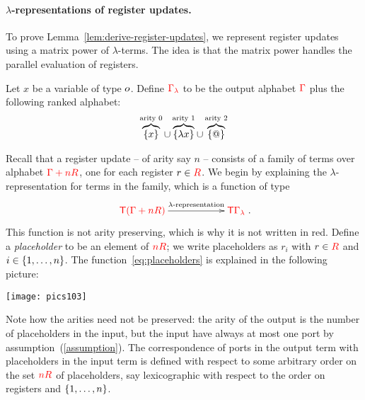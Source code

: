 \paragraph*{$\lambda$-representations of register updates.}
To prove Lemma~\ref{lem:derive-register-updates}, we represent  register updates using a matrix power of $\lambda$-terms. The idea is that the matrix power handles the parallel evaluation of registers.

Let $x$ be a  variable of type $o$. Define  ${\color{red}{\Gamma_\lambda}}$ to be the output alphabet ${\color{red}{\Gamma}}$ plus the following ranked alphabet:
\begin{align}
    \label{eq:alphabet-for-lambda-terms}
  \overbrace{\{x \}}^{\text{arity 0}} \cup \overbrace{\{\lambda x \}}^{\text{arity 1}} \cup  \overbrace{\{@\}}^{\text{arity 2}}
\end{align}

Recall that a register update -- of arity say $n$ -- consists of a family of terms  over alphabet ${\color{red}{\Gamma + n{{\color{red}{R}}}}}$, one for each register $r \in {{\color{red}{R}}}$. We begin by explaining the $\lambda$-representation for terms in the family, which is a function 
 of type
\begin{align}\label{eq:placeholders}
\xymatrix@C=2cm{
    \ranked{\tmonad(\rGamma+n R)} \ar[r]^-{\text{$\lambda$-representation}} &
    \ranked{\tmonad {\Gamma_\lambda}}
}.
\end{align}
This function  is not arity preserving, which is why it is not written in red. Define a  \emph{placeholder} to be an element of ${\color{red}{n {{\color{red}{R}}}}}$; we write placeholders as $r_i$ with $r \in {{\color{red}{R}}}$ and  $i \in \{1,\ldots,n\}$.
The function~\eqref{eq:placeholders}  is  explained in the following picture:
\begin{center}
\texttt{[image: pics103]}
\end{center}
Note how the  
 arities need not be preserved: the arity of the output is the number of placeholders in the input, but the input have always at most one port by assumption~(\ref{assumption}). The correspondence of ports in the output term with placeholders in the input term is defined with respect to some arbitrary order on the set ${\color{red}{n {{\color{red}{R}}}}}$ of placeholders, say lexicographic with respect to the order on registers and  $\{1,\ldots,n\}$.

